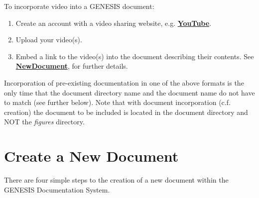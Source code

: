 \documentclass[12pt]{article}
\begin{document}
To incorporate video into a GENESIS document: 

\begin{enumerate}
   \item Create an account with a video sharing website, e.g. \href{http://www.youtube.com/create_account}{\bf YouTube}.
   \item Upload your video(s).
   \item Embed a link to the video(s) into the document describing their contents. See \href{../NewDocument/NewDocument.tex}{\bf NewDocument}, for further details.
\end{enumerate}

Incorporation of pre-existing documentation in one of the above formats is the only time that the document directory name and the document name do not have to match (see further below). Note that with document incorporation (c.f. creation) the document to be included is located in the document directory and NOT the {\it figures} directory.
 
\section*{Create a New Document}

There are four simple steps to the creation of a new document within the GENESIS Documentation System.
\end{document}
